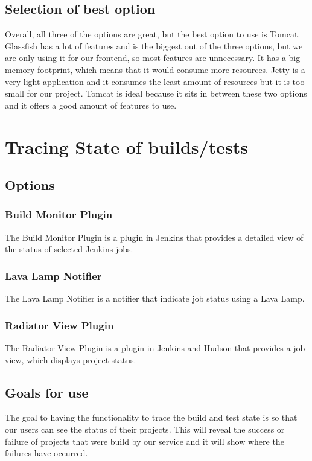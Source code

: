 \documentclass[10pt,letterpaper,onecolumn,journal]{IEEEtran}
\begin{document}
\subsection{Selection of best option}
Overall, all three of the options are great, but the best option to use is Tomcat.
Glassfish has a lot of features and is the biggest out of the three options, but we are only using it for our frontend, so most features are unnecessary.
It has a big memory footprint, which means that it would consume more resources.
Jetty is a very light application and it consumes the least amount of resources but it is too small for our project.
Tomcat is ideal because it sits in between these two options and it offers a good amount of features to use.

\section{Tracing State of builds/tests}
\subsection{Options}
\subsubsection{Build Monitor Plugin}
The Build Monitor Plugin is a plugin in Jenkins that provides a detailed view of the status of selected Jenkins jobs.
\subsubsection{Lava Lamp Notifier}
The Lava Lamp Notifier is a notifier that indicate job status using a Lava Lamp.
\subsubsection{Radiator View Plugin}
The Radiator View Plugin is a plugin in Jenkins and Hudson that provides a job view, which displays project status.
\subsection{Goals for use}
The goal to having the functionality to trace the build and test state is so that our users can see the status of their projects.
This will reveal the success or failure of projects that were build by our service and it will show where the failures have occurred.
\end{document}
